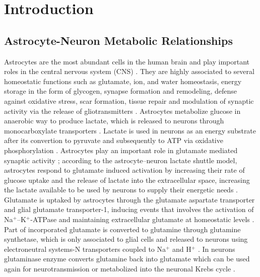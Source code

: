 \section{Introduction}
\subsection*{Astrocyte-Neuron Metabolic Relationships}
Astrocytes are the most abundant cells in the human brain and play important roles in the central nervous system (CNS) \cite{Takuma2004}. They are highly associated to several homeostatic functions such as glutamate, ion, and water homeostasis, energy storage in the form of glycogen, synapse formation and remodeling, defense against oxidative stress, scar formation, tissue repair and modulation of synaptic activity via the release of gliotransmitters \cite{Lange2012}. 
Astrocytes metabolize glucose in anaerobic way to produce lactate, which is released to neurons through monocarboxylate transporters \cite{Kimelberg2010}. Lactate is used in neurons as an energy substrate after its convertion to pyruvate and subsequently to ATP via oxidative phosphorylation \cite{Allen2009}.
Astrocytes play an important role in glutamate mediated synaptic activity \cite{Halassa2010}; according to the astrocyte–neuron lactate shuttle model, astrocytes respond to glutamate induced activation by increasing their rate of glucose uptake and the release of lactate into the extracellular space, increasing the lactate available to be used by neurons to supply their energetic needs \cite{Giaume2010}. Glutamate is uptaked by astrocytes through the glutamate aspartate transporter and glial glutamate transporter-1, inducing events that involves the activation of Na$^+$–K$^+$-ATPase and maintaining extracellular glutamate at homeostatic levels \cite{Nijboer2013}. Part of incorporated glutamate is converted to glutamine through glutamine synthetase, which is only associated to glial cells and released to neurons using electroneutral systems-N transporters coupled to Na$^+$ and H$^+$ \cite{Barres2008}. In neurons glutaminase enzyme converts glutamine back into glutamate which can be used again for neurotransmission or metabolized into the neuronal Krebs cycle \cite{Shen2013}. 
